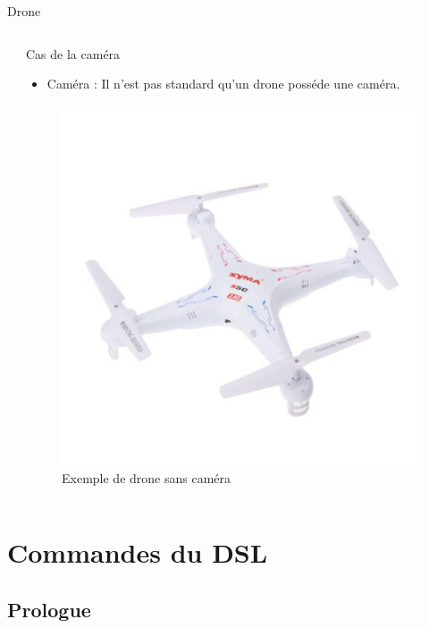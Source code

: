 \documentclass{bredelebeamer}
\begin{document}
\begin{frame}{Drone}
\begin{columns}
\begin{column}{0.65\textwidth}
\end{column}
\begin{column}{0.35\textwidth}
\begin{alertblock}{Cas de la caméra}
\begin{itemize}
\item Caméra : Il n'est pas standard qu'un drone posséde une caméra.
\end{itemize}
\end{alertblock}
\begin{figure}
\centering
\includegraphics[scale=0.20]{images/img3.jpeg}
\caption{Exemple de drone sans caméra}
\end{figure}
\vspace{15px}
\end{column}
\end{columns}
\end{frame}

\section{Commandes du DSL}
	\subsection{Prologue}
\end{document}

